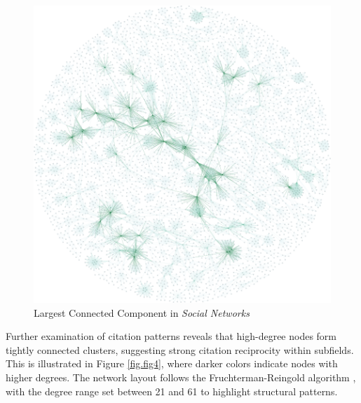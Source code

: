 \documentclass[twocolumn]{article}
\begin{document}
	\begin{figure}[htbp]
		\centering
		\includegraphics[width=\columnwidth]{"Social Networks/Gephi/largest_component.pdf"}
		\caption{Largest Connected Component in \textit{Social Networks}}
		\label{fig.fig3}
	\end{figure}
	
	Further examination of citation patterns reveals that high-degree nodes form tightly connected clusters, suggesting strong citation reciprocity within subfields. This is illustrated in Figure \ref{fig.fig4}, where darker colors indicate nodes with higher degrees. The network layout follows the Fruchterman-Reingold algorithm \cite{fruchterman1991graph}, with the degree range set between 21 and 61 to highlight structural patterns.
	
\end{document}
